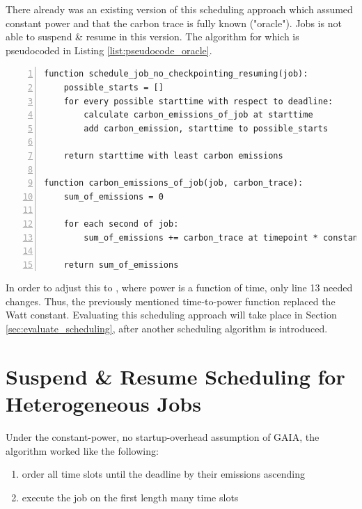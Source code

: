There already was an existing version of this scheduling approach which assumed constant power and that the carbon trace is fully known ("oracle"). 
Jobs is not able to suspend \& resume in this version.
The algorithm for which is pseudocoded in Listing \ref{list:pseudocode_oracle}.

\begin{minipage}{\linewidth}
\begin{lstlisting}[frame=single, numbers=left, caption={Pseudocode for the original non-interrupt oracle scheduler}, label={list:pseudocode_oracle}, basicstyle=\ttfamily]
function schedule_job_no_checkpointing_resuming(job):
    possible_starts = []
    for every possible starttime with respect to deadline:
        calculate carbon_emissions_of_job at starttime
        add carbon_emission, starttime to possible_starts
    
    return starttime with least carbon emissions

function carbon_emissions_of_job(job, carbon_trace):
    sum_of_emissions = 0

    for each second of job:
        sum_of_emissions += carbon_trace at timepoint * constant_watt
    
    return sum_of_emissions
\end{lstlisting}
\end{minipage}

In order to adjust this to \modelname, where power is a function of time, only line 13 needed changes. 
Thus, the previously mentioned time-to-power function replaced the Watt constant.
Evaluating this scheduling approach will take place in Section \ref{sec:evaluate_scheduling}, after another scheduling algorithm is introduced.

\section{{Suspend \& Resume Scheduling for Heterogeneous Jobs}} \label{sec:checkpoint_resume_lp}

Under the constant-power, no startup-overhead assumption of GAIA, the algorithm worked like the following:

\begin{enumerate}
    \item order all time slots until the deadline by their emissions ascending
    \item execute the job on the first length many time slots
\end{enumerate}

